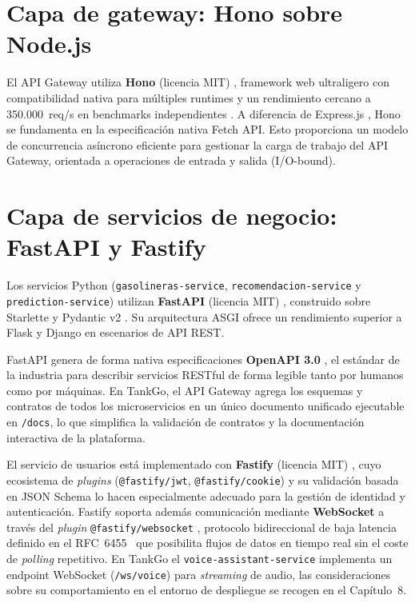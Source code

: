 \section{Capa de gateway: Hono sobre Node.js}

El API Gateway utiliza \textbf{Hono} (licencia MIT) \cite{hono}, framework web ultraligero con
compatibilidad nativa para múltiples runtimes y un rendimiento cercano a 350.000~req/s
en benchmarks independientes \cite{hono_benchmarks}. A diferencia de Express.js \cite{express},
Hono se fundamenta en la especificación nativa Fetch API. Esto proporciona un modelo de concurrencia
asíncrono eficiente para gestionar la carga de trabajo del API Gateway, orientada
a operaciones de entrada y salida (I/O-bound).


\section{Capa de servicios de negocio: FastAPI y Fastify}

{\sloppy
Los servicios Python (\texttt{gasolineras-service}, \texttt{recomendacion-service} 
y \texttt{prediction-service}) utilizan \textbf{FastAPI} (licencia MIT) 
\cite{afolabi_fastapi_benchmark, ijsrem_fastapi_comparison}, construido sobre 
Starlette \cite{starlette} y Pydantic v2 \cite{pydantic}. Su arquitectura ASGI 
ofrece un rendimiento superior a Flask \cite{flask} y Django \cite{django} en 
escenarios de API REST.

FastAPI genera de forma nativa especificaciones \textbf{OpenAPI 3.0} \cite{openapi}, 
el estándar de la industria para describir servicios RESTful de forma legible tanto 
por humanos como por máquinas. En TankGo, el API Gateway agrega los esquemas y 
contratos de todos los microservicios en un único documento unificado ejecutable 
en \texttt{/docs}, lo que simplifica la validación de contratos y la documentación 
interactiva de la plataforma.

El servicio de usuarios está implementado con \textbf{Fastify} (licencia MIT) \cite{fastify}, 
cuyo ecosistema de \textit{plugins} (\texttt{@fastify/jwt}, \texttt{@fastify/cookie}) 
\cite{fastify_jwt, fastify_cookie} y su validación basada en JSON Schema lo hacen 
especialmente adecuado para la gestión de identidad y autenticación. Fastify soporta 
además comunicación mediante \textbf{WebSocket} a través del \textit{plugin} 
\texttt{@fastify/websocket} \cite{fastify_websocket}, protocolo bidireccional de baja 
latencia definido en el RFC~6455~\cite{rfc6455_websocket} que posibilita flujos de 
datos en tiempo real sin el coste de \textit{polling} repetitivo. En TankGo el 
\texttt{voice-assistant-service} implementa un endpoint WebSocket (\texttt{/ws/voice}) 
para \textit{streaming} de audio, las consideraciones sobre su comportamiento en el 
entorno de despliegue se recogen en el Capítulo~8.
\par}
